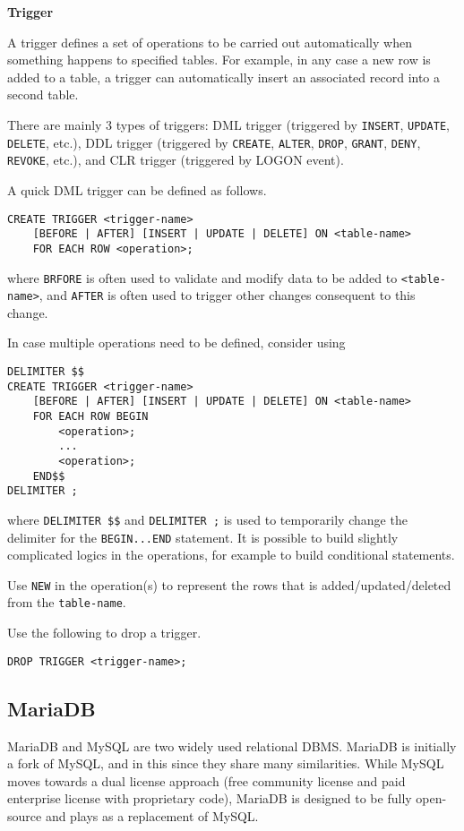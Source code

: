\vspace{0.1in}
\noindent \textbf{Trigger}
\vspace{0.1in}

A trigger defines a set of operations to be carried out automatically when something happens to specified tables. For example, in any case a new row is added to a table, a trigger can automatically insert an associated record into a second table.

There are mainly 3 types of triggers: DML trigger (triggered by \verb|INSERT|, \verb|UPDATE|, \verb|DELETE|, etc.), DDL trigger (triggered by \verb|CREATE|, \verb|ALTER|, \verb|DROP|, \verb|GRANT|, \verb|DENY|, \verb|REVOKE|, etc.), and CLR trigger (triggered by LOGON event).

A quick DML trigger can be defined as follows.
\begin{lstlisting}
CREATE TRIGGER <trigger-name>
    [BEFORE | AFTER] [INSERT | UPDATE | DELETE] ON <table-name>
    FOR EACH ROW <operation>;
\end{lstlisting}
where \verb|BRFORE| is often used to validate and modify data to be added to \verb|<table-name>|, and \verb|AFTER| is often used to trigger other changes consequent to this change.

In case multiple operations need to be defined, consider using
\begin{lstlisting}
DELIMITER $$
CREATE TRIGGER <trigger-name>
    [BEFORE | AFTER] [INSERT | UPDATE | DELETE] ON <table-name>
    FOR EACH ROW BEGIN
        <operation>;
        ...
        <operation>;
    END$$
DELIMITER ;
\end{lstlisting}
where \verb|DELIMITER $$| and \verb|DELIMITER ;| is used to temporarily change the delimiter for the \verb|BEGIN...END| statement. It is possible to build slightly complicated logics in the operations, for example to build conditional statements.

Use \verb|NEW| in the operation(s) to represent the rows that is added/updated/deleted from the \verb|table-name|.

Use the following to drop a trigger.
\begin{lstlisting}
DROP TRIGGER <trigger-name>;
\end{lstlisting}

\subsection{MariaDB}

MariaDB and MySQL are two widely used relational DBMS. MariaDB is initially a fork of MySQL, and in this since they share many similarities. While MySQL moves towards a dual license approach (free community license and paid enterprise license with proprietary code), MariaDB is designed to be fully open-source and plays as a replacement of MySQL.

